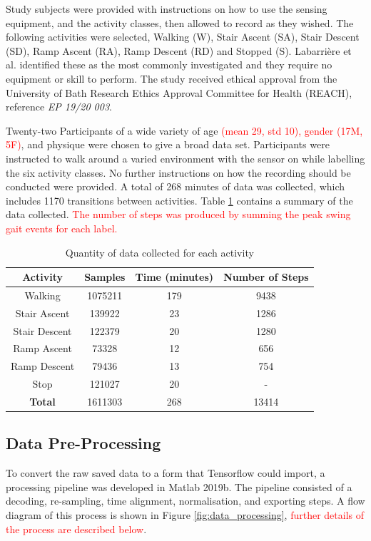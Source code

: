 \documentclass[sensors,article,submit,moreauthors,pdftex]{Definitions/mdpi}
\begin{document}
Study subjects were provided with instructions on how to use the sensing equipment, and the activity classes, then allowed to record as they wished. The following activities were selected, Walking (W), Stair Ascent (SA), Stair Descent (SD), Ramp Ascent (RA), Ramp Descent (RD) and Stopped (S). Labarri\`ere et al. identified these as the most commonly investigated and they require no equipment or skill to perform\cite{Labarriere2020}. The study received ethical approval from the University of Bath Research Ethics Approval Committee for Health (REACH), reference \textit{EP 19/20 003}.

Twenty-two Participants of a wide variety of age \textcolor{red}{(mean 29, std 10), gender (17M, 5F)}, and physique were chosen to give a broad data set. Participants were instructed to walk around a varied environment with the sensor on while labelling the six activity classes. No further instructions on how the recording should be conducted were provided. A total of 268 minutes of data was collected, which includes 1170 transitions between activities. Table \ref{tab:data_collected_summary} contains a summary of the data collected. \textcolor{red}{The number of steps was produced by summing the peak swing gait events for each label.}

\begin{table}[!hbt]
    \centering
    \caption{Quantity of data collected for each activity}
    \label{tab:data_collected_summary}
    \begin{tabular}{cccc}
        \textbf{Activity} & \textbf{Samples} & \textbf{Time (minutes)} & \textbf{Number of Steps} \\
         \hline
         Walking & 1075211 & 179 & 9438 \\
         Stair Ascent & 139922 & 23 & 1286 \\
         Stair Descent & 122379 & 20 & 1280 \\ 
         Ramp Ascent & 73328 & 12 & 656 \\
         Ramp Descent & 79436 & 13 & 754 \\
         Stop & 121027 & 20 & - \\
         \hline
         \textbf{Total} & 1611303 & 268 & 13414
    \end{tabular}
\end{table}

\subsection{Data Pre-Processing}
\label{sec:pre-processing}
To convert the raw saved data to a form that Tensorflow could import, a processing pipeline was developed in Matlab 2019b. The pipeline consisted of a decoding, re-sampling, time alignment, normalisation, and exporting steps. A flow diagram of this process is shown in Figure \ref{fig:data_processing}, \textcolor{red}{further details of the process are described below}.
\end{document}
